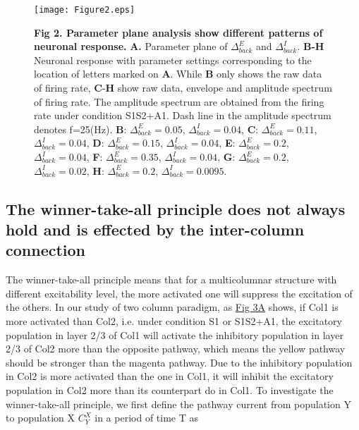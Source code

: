 \documentclass[10pt,letterpaper]{article}
\begin{document}
\begin{figure}[!h]
\begin{adjustwidth}{-2in}{0.3in} %
\centering
\texttt{[image: Figure2.eps]}
\begin{flushleft} {\bf Fig 2. Parameter plane analysis show different patterns of neuronal response.}
\textbf{A.} Parameter plane of $\Delta_{back}^{E}$ and $\Delta_{back}^{I}$. \textbf{B-H} Neuronal response with parameter settings corresponding to the location of letters marked on \textbf{A}. While \textbf{B} only shows the raw data of firing rate, \textbf{C}-\textbf{H} show raw data, envelope and amplitude spectrum of firing rate. The amplitude spectrum are obtained from the firing rate under condition S1S2+A1. Dash line in the amplitude spectrum denotes f=25(Hz). \textbf{B}: $\Delta_{back}^{E}=0.05$, $\Delta_{back}^{I}=0.04$, \textbf{C}: $\Delta_{back}^{E}=0.11$, $\Delta_{back}^{I}=0.04$, \textbf{D}: $\Delta_{back}^{E}=0.15$, $\Delta_{back}^{I}=0.04$, \textbf{E}: $\Delta_{back}^{E}=0.2$, $\Delta_{back}^{I}=0.04$, \textbf{F}: $\Delta_{back}^{E}=0.35$, $\Delta_{back}^{I}=0.04$, \textbf{G}: $\Delta_{back}^{E}=0.2$, $\Delta_{back}^{I}=0.02$, \textbf{H}: $\Delta_{back}^{E}=0.2$, $\Delta_{back}^{I}=0.0095$. 
\end{flushleft}
\hypertarget{fig:fig2}{}
\end{adjustwidth}
\end{figure}

\subsection*{The winner-take-all principle does not always hold and is effected by the inter-column connection}
The winner-take-all principle means that for a multicolumnar structure with different excitability level, the more activated one will suppress the excitation of the others. In our study of two column paradigm, as \hyperlink{fig:fig3}{Fig 3A} shows, if Col1 is more activated than Col2, i.e. under condition S1 or S1S2+A1, the excitatory population in layer 2/3 of Col1 will activate the inhibitory population in layer 2/3 of Col2 more than the opposite pathway, which means the yellow pathway should be stronger than the magenta pathway. Due to the inhibitory population in Col2 is more activated than the one in Col1, it will inhibit the excitatory population in Col2 more than its counterpart do in Col1.
To investigate the winner-take-all principle, we first define the pathway current from population Y to population X $C_{Y}^{X}$ in a period of time T as
\end{document}
